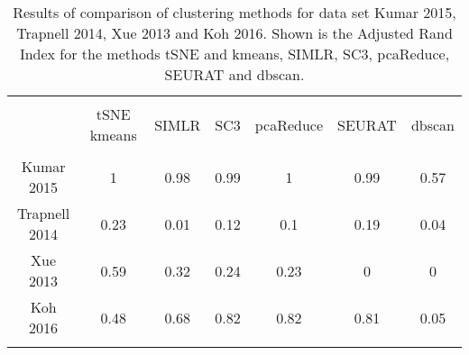 \documentclass{article}\usepackage[]{graphicx}\usepackage[]{color}
\begin{document}
\begin{table}[!htbp] \centering 
  \caption{Results of comparison of clustering methods for data set Kumar 2015, Trapnell 2014, Xue 2013 and Koh 2016. Shown is the Adjusted Rand Index for the methods tSNE and kmeans, SIMLR, SC3, pcaReduce, SEURAT and dbscan.} 
  \label{} 
\begin{tabular}{@{\extracolsep{5pt}} ccccccc} 
\\[-1.8ex]\hline 
\hline \\[-1.8ex] 
 & tSNE kmeans & SIMLR & SC3 & pcaReduce & SEURAT & dbscan \\ 
\hline \\[-1.8ex] 
Kumar 2015 & 1 & 0.98 & 0.99 & 1 & 0.99 & 0.57 \\ 
Trapnell 2014 & 0.23 & 0.01 & 0.12 & 0.1 & 0.19 & 0.04 \\ 
Xue 2013 & 0.59 & 0.32 & 0.24 & 0.23 & 0 & 0 \\ 
Koh 2016 & 0.48 & 0.68 & 0.82 & 0.82 & 0.81 & 0.05 \\ 
\hline \\[-1.8ex] 
\end{tabular} 
\end{table}
\end{document}
